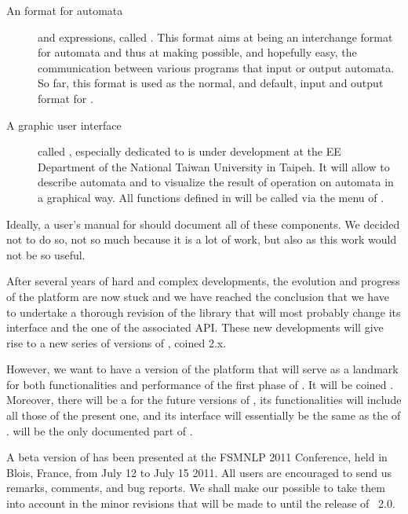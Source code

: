 \begin{description}
\item[An \xml format for automata] and expressions, called \fsmxml.
This format aims at being an interchange format for automata and thus 
at making possible, and hopefully easy, the communication between 
various programs that input or output automata.
So far,  this format is used as the normal, and default, input and 
output format for \tafkit.

\item[A graphic user interface] called \vgi, especially dedicated to
\vcsn is under development at the EE Department of the National Taiwan
University in Taipeh.  It will allow to describe automata and to visualize
the result of operation on automata in a graphical way.  All functions
defined in \tafkit will be called via the menu of \vgi.


\end{description}

Ideally, a user's manual for \vcsn should document all of these components.
We decided not to do so, not so much because it is a lot of work, but 
also as this work would not be so useful.

After several years of hard and complex developments, the evolution 
and progress of the \vcsn platform are now stuck and we have reached 
the conclusion that we have to undertake a thorough revision of the 
\vcsn library that will most probably change its interface and the one 
of the associated API.
These new developments will give rise to a new series of 
versions of \vcsn, coined \vcsn 2.x.



However, we want to have a version of the platform that will serve as 
a landmark for both functionalities and  
performance of the first phase of \vcsn.
It will be coined \vcsnv.
Moreover, there will be a \tafkit for the future versions of \vcsn,
its  functionalities will include all those of the present one,
and its interface will essentially be the same as the \tafkit of 
\vcsnv.
\tafkitv will be the only documented part of \vcsnv.

A beta version of \vcsnv has been presented at the FSMNLP 2011 Conference, 
held in Blois, France, from July 12 to July 15 2011.
All users are encouraged to send us remarks, comments, and bug reports.
We shall make our possible to take them into account in the minor 
revisions that will be made to \vcsnv until the release of \vcsn~2.0.

\endinput 


